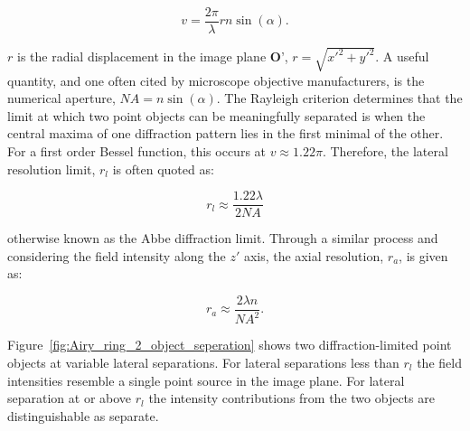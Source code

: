 \begin{equation}\label{eq:normalised_lateral}
v = \frac{2\pi}{\lambda}rn\sin(\alpha).
\end{equation}

$r$ is the radial displacement in the image plane $\textbf{O'}$, $r = \sqrt{x'^{2} + y'^{2}}$. 
A useful quantity, and one often cited by microscope objective manufacturers, 
is the numerical aperture, $NA = n\sin(\alpha)$. The Rayleigh criterion 
determines that the limit at which two point objects can be meaningfully 
separated is when the central maxima of one diffraction pattern lies in the
first minimal of the other\cite{rayleigh1874xii,rayleigh1880investigations}. For a first order Bessel 
function, this occurs at $v \approx 1.22\pi$. Therefore, the lateral resolution 
limit, $r_l$ is often quoted as:

\begin{equation}\label{eq:lateral_res}
r_l \approx \frac{1.22\lambda}{2NA}
\end{equation}

otherwise known as the Abbe diffraction limit\cite{abbe1873beitrage}. Through
a similar process and considering the field intensity along the $z'$ axis, the
axial resolution, $r_a$, is given as\cite{pawley2006handbook}:

\begin{equation}\label{eq:axial_res}
r_a \approx \frac{2\lambda n}{NA^{2}}.
\end{equation}

Figure~\ref{fig:Airy_ring_2_object_seperation} shows two 
diffraction-limited point objects at variable lateral separations. For 
lateral separations less than $r_{l}$ the field intensities resemble a single 
point source in the image plane. For lateral separation at or above $r_{l}$ 
the intensity contributions from the two objects are distinguishable as 
separate.

